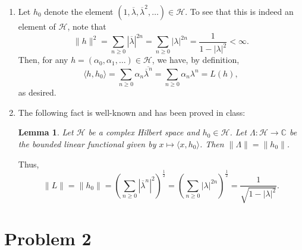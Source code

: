 \documentclass[10pt]{amsart}
\theoremstyle{thmstyle}
\newtheorem{lemma}[theorem]{Lemma}
\theoremstyle{defstyle}
\newcommand{\bbC}{\mathbb{C}}
\newcommand{\calH}{\mathcal{H}} %
\renewcommand{\ge}{\geqslant}
\begin{document}
\begin{enumerate}[label=(\alph*)]
\item Let $h_0$ denote the element $(1, \overline\lambda,\overline\lambda^2,\dots)\in\calH$. To see that this is indeed an element of $\calH$, note that 
\begin{equation*}
    \|h\|^2 = \sum_{n\ge 0}|\overline\lambda|^{2n} = \sum_{n\ge 0}|\lambda|^{2n} = \frac{1}{1 - |\lambda|^2} < \infty.
\end{equation*}
Then, for any $h = (\alpha_0,\alpha_1,\dots)\in\calH$, we have, by definition, 
\begin{equation*}
    \langle h, h_0\rangle = \sum_{n\ge 0}\alpha_n\overline{\overline\lambda^n} = \sum_{n\ge 0}\alpha_n\lambda^n = L(h),
\end{equation*}
as desired. 

\item The following fact is well-known and has been proved in class: 
\begin{lemma}
    Let $\calH$ be a complex Hilbert space and $h_0\in\calH$. Let $\Lambda:\calH\to\bbC$ be the bounded linear functional given by $x\mapsto\langle x, h_0\rangle$. Then $\|\Lambda\| = \|h_0\|$.
\end{lemma}

Thus, 
\begin{equation*}
    \|L\| = \|h_0\| = \left(\sum_{n\ge 0}|\overline\lambda^n|^2\right)^{\frac{1}{2}} = \left(\sum_{n\ge 0}|\lambda|^{2n}\right)^{\frac{1}{2}} = \frac{1}{\sqrt{1 - |\lambda|^2}}.
\end{equation*}
\end{enumerate}

\section{Problem 2}
\end{document}
